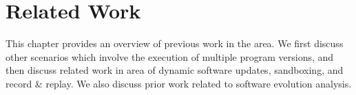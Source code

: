 \chapter{Related Work}
\label{chap:related}

This chapter provides an overview of previous work in the area.  We first
discuss other scenarios which involve the execution of multiple program
versions, and then discuss related work in area of dynamic software updates,
sandboxing, and record \& replay. We also discuss prior work related to
software evolution analysis.








  


